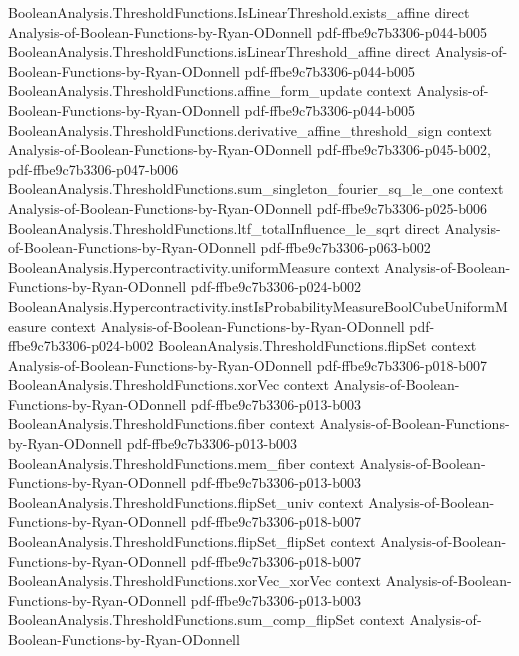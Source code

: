 \begin{theorem}
\proofstep
  {BooleanAnalysis.ThresholdFunctions.IsLinearThreshold.exists_affine}
  {direct}
  {Analysis-of-Boolean-Functions-by-Ryan-ODonnell}
  {pdf-ffbe9c7b3306-p044-b005}
\proofstep
  {BooleanAnalysis.ThresholdFunctions.isLinearThreshold_affine}
  {direct}
  {Analysis-of-Boolean-Functions-by-Ryan-ODonnell}
  {pdf-ffbe9c7b3306-p044-b005}
\proofstep
  {BooleanAnalysis.ThresholdFunctions.affine_form_update}
  {context}
  {Analysis-of-Boolean-Functions-by-Ryan-ODonnell}
  {pdf-ffbe9c7b3306-p044-b005}
\proofstep
  {BooleanAnalysis.ThresholdFunctions.derivative_affine_threshold_sign}
  {context}
  {Analysis-of-Boolean-Functions-by-Ryan-ODonnell}
  {pdf-ffbe9c7b3306-p045-b002,
    pdf-ffbe9c7b3306-p047-b006}
\proofstep
  {BooleanAnalysis.ThresholdFunctions.sum_singleton_fourier_sq_le_one}
  {context}
  {Analysis-of-Boolean-Functions-by-Ryan-ODonnell}
  {pdf-ffbe9c7b3306-p025-b006}
\proofstep
  {BooleanAnalysis.ThresholdFunctions.ltf_totalInfluence_le_sqrt}
  {direct}
  {Analysis-of-Boolean-Functions-by-Ryan-ODonnell}
  {pdf-ffbe9c7b3306-p063-b002}
\proofstep
  {BooleanAnalysis.Hypercontractivity.uniformMeasure}
  {context}
  {Analysis-of-Boolean-Functions-by-Ryan-ODonnell}
  {pdf-ffbe9c7b3306-p024-b002}
\proofstep
  {BooleanAnalysis.Hypercontractivity.instIsProbabilityMeasureBoolCubeUniformMeasure}
  {context}
  {Analysis-of-Boolean-Functions-by-Ryan-ODonnell}
  {pdf-ffbe9c7b3306-p024-b002}
\proofstep
  {BooleanAnalysis.ThresholdFunctions.flipSet}
  {context}
  {Analysis-of-Boolean-Functions-by-Ryan-ODonnell}
  {pdf-ffbe9c7b3306-p018-b007}
\proofstep
  {BooleanAnalysis.ThresholdFunctions.xorVec}
  {context}
  {Analysis-of-Boolean-Functions-by-Ryan-ODonnell}
  {pdf-ffbe9c7b3306-p013-b003}
\proofstep
  {BooleanAnalysis.ThresholdFunctions.fiber}
  {context}
  {Analysis-of-Boolean-Functions-by-Ryan-ODonnell}
  {pdf-ffbe9c7b3306-p013-b003}
\proofstep
  {BooleanAnalysis.ThresholdFunctions.mem_fiber}
  {context}
  {Analysis-of-Boolean-Functions-by-Ryan-ODonnell}
  {pdf-ffbe9c7b3306-p013-b003}
\proofstep
  {BooleanAnalysis.ThresholdFunctions.flipSet_univ}
  {context}
  {Analysis-of-Boolean-Functions-by-Ryan-ODonnell}
  {pdf-ffbe9c7b3306-p018-b007}
\proofstep
  {BooleanAnalysis.ThresholdFunctions.flipSet_flipSet}
  {context}
  {Analysis-of-Boolean-Functions-by-Ryan-ODonnell}
  {pdf-ffbe9c7b3306-p018-b007}
\proofstep
  {BooleanAnalysis.ThresholdFunctions.xorVec_xorVec}
  {context}
  {Analysis-of-Boolean-Functions-by-Ryan-ODonnell}
  {pdf-ffbe9c7b3306-p013-b003}
\proofstep
  {BooleanAnalysis.ThresholdFunctions.sum_comp_flipSet}
  {context}
  {Analysis-of-Boolean-Functions-by-Ryan-ODonnell}

\end{theorem}
